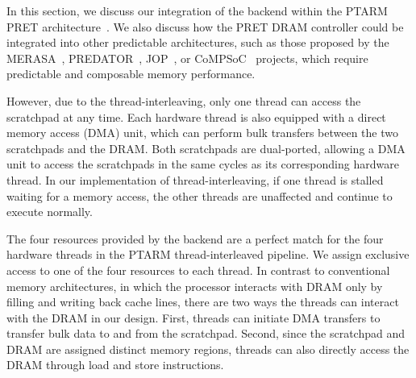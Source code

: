 

In this section, we discuss our integration of the backend within the PTARM PRET architecture~\cite{Liu10}.
We also  discuss how the PRET DRAM controller could be integrated into other predictable architectures, such as those proposed by the MERASA~\cite{Ungerer10}, PREDATOR~\cite{Wilhelm09}, JOP~\cite{Schoeberl2008265}, or CoMPSoC~\cite{Hansson09} projects, which require predictable and composable memory performance.

% 

However, due to the thread-interleaving, only one thread can access the scratchpad at any time.
Each hardware thread is also equipped with a direct memory access (DMA) unit, which can perform bulk transfers between the two scratchpads and the DRAM.
Both scratchpads are dual-ported, allowing a DMA unit to access the scratchpads in the same cycles as its corresponding hardware thread.
In our implementation of thread-interleaving, if one thread is stalled waiting for a memory access, the other threads are unaffected and continue to execute normally.

The four resources provided by the backend are a perfect match for the four hardware threads in the PTARM thread-interleaved pipeline.
We assign exclusive access to one of the four resources to each thread.
In contrast to conventional memory architectures, in which the processor interacts with DRAM only by filling and writing back cache lines, there are two ways the threads can interact with the DRAM in our design.
First, threads can initiate DMA transfers to transfer bulk data to and from the scratchpad. 
Second, since the scratchpad and DRAM are assigned distinct memory regions, threads can also directly access the DRAM through load and store instructions. 

